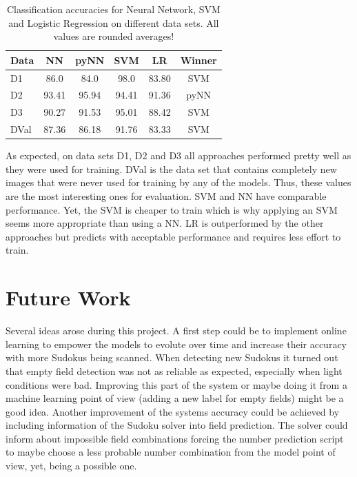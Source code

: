 \documentclass{article}
\begin{document}
\begin{table}[t]
\caption{Classification accuracies for Neural Network, SVM and Logistic Regression on different data sets. All values are rounded averages!}
\label{sample-table}
\vskip 0.15in
\begin{center}
\begin{small}
\begin{sc}
\begin{tabular}{lccccc}
\hline
\abovespace\belowspace
Data & NN & pyNN & SVM & LR & Winner \\
\hline
\abovespace
D1 		& 86.0 & 84.0 & 98.0 & 83.80 & SVM\\
D2		& 93.41 & 95.94 & 94.41 & 91.36 & pyNN\\
D3		& 90.27 & 91.53 & 95.01 & 88.42 & SVM\\
\belowspace
DVal	& 87.36 & 86.18 & 91.76 & 83.33 & SVM\\
\hline
\end{tabular}
\end{sc}
\end{small}
\end{center}
\vskip -0.1in
\end{table}
As expected, on data sets D1, D2 and D3 all approaches performed pretty well as they were used for training. DVal is the data set that contains completely new images that were never used for training by any of the models. Thus, these values are the most interesting ones for evaluation. SVM and NN have comparable performance. Yet, the SVM is cheaper to train which is why applying an SVM seems more appropriate than using a NN. LR is outperformed by the other approaches but predicts with acceptable performance and requires less effort to train.

\section{Future Work}
Several ideas arose during this project. A first step could be to implement online learning to empower the models to evolute over time and increase their accuracy with more Sudokus being scanned. When detecting new Sudokus it turned out that empty field detection was not as reliable as expected, especially when light conditions were bad. Improving this part of the system or maybe doing it from a machine learning point of view (adding a new label for empty fields) might be a good idea. Another improvement of the systems accuracy could be achieved by including information of the Sudoku solver into field prediction. The solver could inform about impossible field combinations forcing the number prediction script to maybe choose a less probable number combination from the model point of view, yet, being a possible one.



\end{document}
